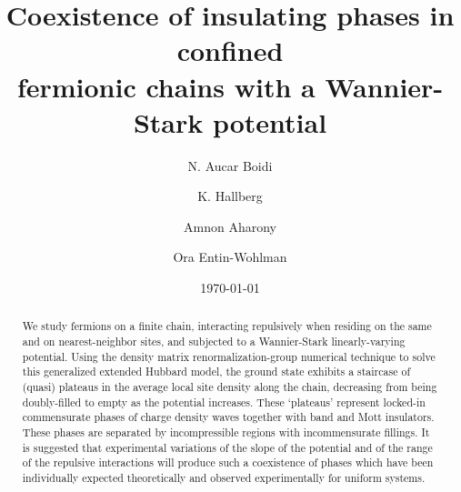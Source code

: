 \documentclass[aps,prl,showpacs,twocolumn,superscriptaddress]{revtex4-2}
\begin{document}
\title{
Coexistence of insulating phases in confined \\fermionic chains with a Wannier-Stark potential}



\author{N. Aucar Boidi}

\author{K. Hallberg}

\author{Amnon Aharony}

\author{Ora Entin-Wohlman}


\date{\today}



\begin{abstract}
\noindent

We study  fermions  on a finite chain, interacting repulsively when residing   on the same  and on nearest-neighbor sites, and subjected to a Wannier-Stark linearly-varying potential.
Using the density matrix renormalization-group numerical technique to solve this generalized extended Hubbard model,  the ground state exhibits a staircase of (quasi) plateaus in the average local site  density along the chain, decreasing from being doubly-filled to empty as the potential increases. These `plateaus' represent locked-in commensurate phases of charge density waves together with band and Mott insulators. These phases  are separated by incompressible regions with incommensurate fillings. It is suggested that experimental variations of the slope of the potential and of the range of the  repulsive interactions will produce such a coexistence of phases which have been individually expected theoretically and observed experimentally for uniform systems.
\end{abstract}
\end{document}
